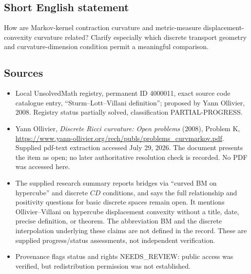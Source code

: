 \documentclass[11pt]{article}
\begin{document}
\subsection{Short English statement}
How are Markov-kernel contraction curvature and metric-measure displacement-convexity curvature related? Clarify especially which discrete transport geometry and curvature-dimension condition permit a meaningful comparison.
\subsection{Sources}
\begin{itemize}
\item Local UnsolvedMath registry, permanent ID 4000011, exact source code catalogue entry, ``Sturm--Lott--Villani definition''; proposed by Yann Ollivier, 2008. Registry status partially solved, classification PARTIAL-PROGRESS.
\item Yann Ollivier, \emph{Discrete Ricci curvature: Open problems} (2008), Problem K, \url{https://www.yann-ollivier.org/rech/publs/problems_curvmarkov.pdf}. Supplied pdf-text extraction accessed July 29, 2026. The document presents the item as open; no later authoritative resolution check is recorded. No PDF was accessed here.
\item The supplied research summary reports bridges via ``curved BM on hypercube'' and discrete $CD$ conditions, and says the full relationship and positivity questions for basic discrete spaces remain open. It mentions Ollivier--Villani on hypercube displacement convexity without a title, date, precise definition, or theorem. The abbreviation BM and the discrete interpolation underlying these claims are not defined in the record. These are supplied progress/status assessments, not independent verification.
\item Provenance flags status and rights NEEDS\_REVIEW: public access was verified, but redistribution permission was not established.
\end{itemize}
\end{document}
